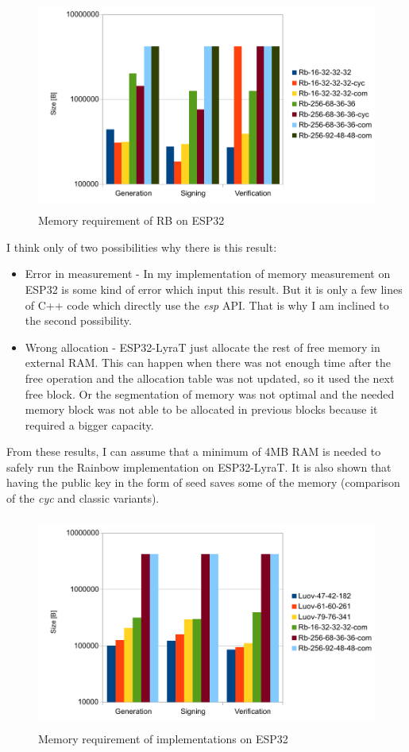 \documentclass[thesis=M,english]{FITthesis}[2019/12/23]
\begin{document}
\begin{figure}[H]
\centering
\includegraphics[width=13cm,height=7cm]{images/mem-rb.pdf}
\caption{Memory requirement of RB on ESP32}
\label{mem-rb}
\end{figure}

\noindent
I think only of two possibilities why there is this result:
\begin{itemize}
\item	Error in measurement - In my implementation of memory measurement on ESP32 is some kind of error which input this result. But it is only a few lines of C++ code which directly use the \textit{esp} API. That is why I am inclined to the second possibility.
\item	Wrong allocation - ESP32-LyraT just allocate the rest of free memory in external RAM. This can happen when there was not enough time after the free operation and the allocation table was not updated, so it used the next free block. Or the segmentation of memory was not optimal and the needed memory block was not able to be allocated in previous blocks because it required a bigger capacity.
\end{itemize}

\bigskip
\noindent
From these results, I can assume that a minimum of 4MB RAM is needed to safely run the Rainbow implementation on ESP32-LyraT. It is also shown that having the public key in the form of seed saves some of the memory (comparison of the \textit{cyc} and classic variants).

\begin{figure}[H]
\centering
\includegraphics[width=13cm,height=7cm]{images/mem-both.pdf}
\caption{Memory requirement of implementations on ESP32}
\label{mem-both}
\end{figure}
\end{document}

